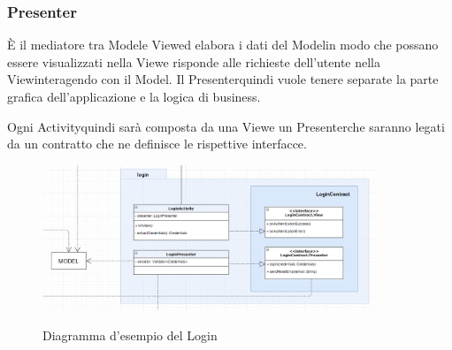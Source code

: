\subsubsection{Presenter}
È il mediatore tra Model\glosp e View\glosp ed elabora i dati del Model\glosp in modo che possano essere visualizzati nella View\glosp e risponde alle richieste dell'utente nella
View\glosp interagendo con il Model. Il Presenter\glosp quindi vuole tenere separate la parte grafica dell'applicazione e la logica di business.

Ogni Activity\glosp quindi sarà composta da una View\glosp e un Presenter\glosp che saranno legati da un contratto che ne definisce le rispettive interfacce.
\begin{figure}[H]
	\centering
	\includegraphics[width=0.9\textwidth]
	{res/images/contratto.png}\\
	\caption{Diagramma d'esempio del Login}
	\label{Schema Login}
\end{figure}
\newpage
